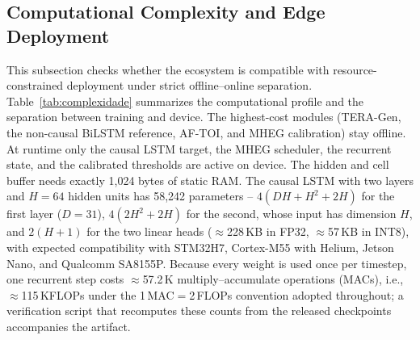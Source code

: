 \documentclass[a4paper,fleqn]{cas-dc}
\newcommand{\TERAGen}{\mbox{TERA-Gen}\xspace}
\newcommand{\AFTOI}{\mbox{AF-TOI}\xspace}
\newcommand{\MHEG}{\mbox{MHEG}\xspace}
\begin{document}
\subsection{Computational Complexity and Edge Deployment}
\label{sec:complexidade}
This subsection checks whether the ecosystem is compatible with resource-constrained deployment under strict offline--online separation.
Table~\ref{tab:complexidade} summarizes the computational profile and the
separation between training and device. The highest-cost modules (\TERAGen, the
non-causal BiLSTM reference, \AFTOI, and \MHEG calibration) stay offline. At
runtime only the causal LSTM target, the \MHEG scheduler, the recurrent state,
and the calibrated thresholds are active on device.
The hidden and cell buffer needs exactly 1,024 bytes of static RAM. The causal
LSTM with two layers and $H{=}64$ hidden units has {\color{\revcolor}58{,}242
parameters -- $4(DH{+}H^2{+}2H)$ for the first layer ($D{=}31$),
$4(2H^2{+}2H)$ for the second, whose input has dimension $H$, and $2(H{+}1)$
for the two linear heads} ($\approx$228\,KB in FP32, $\approx$57\,KB in INT8),
with expected compatibility with STM32H7, Cortex-M55 with Helium, Jetson Nano,
and Qualcomm SA8155P. {\color{\revcolor}Because every weight is used once per
timestep, one recurrent step costs $\approx$57.2\,K multiply--accumulate
operations (MACs), i.e., $\approx$115\,KFLOPs under the 1\,MAC${}={}$2\,FLOPs
convention adopted throughout; a verification script that recomputes these
counts from the released checkpoints accompanies the artifact.}
\end{document}
